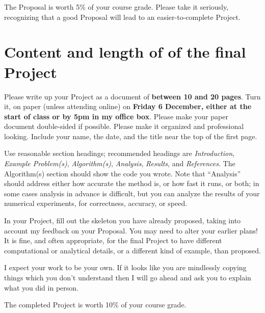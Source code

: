 \documentclass[11pt]{amsart}
\begin{document}
The Proposal is worth 5\% of your course grade.  Please take it seriously, recognizing that a good Proposal will lead to an easier-to-complete Project.


\section*{Content and length of of the final Project}  

Please write up your Project as a document of \textbf{between 10 and 20 pages}.  Turn it, on paper (unless attending online) on \textbf{Friday 6 December, either at the start of class or by 5pm in my office box}.  Please make your paper document double-sided if possible.  Please make it organized and professional looking.  Include your name, the date, and the title near the top of the first page.

Use reasonable section headings; recommended headings are \emph{Introduction}, \emph{Example Problem(s)}, \emph{Algorithm(s)}, \emph{Analysis}, \emph{Results}, and \emph{References}.  The Algorithm(s) section should show the code you wrote.  Note that ``Analysis'' should address either how accurate the method is, or how fast it runs, or both; in some cases analysis in advance is difficult, but you can analyze the results of your numerical experiments, for correctness, accuracy, or speed.

In your Project, fill out the skeleton you have already proposed, taking into account my feedback on your Proposal.  You may need to alter your earlier plans!  It is fine, and often appropriate, for the final Project to have different computational or analytical details, or a different kind of example, than proposed.

I expect your work to be your own.  If it looks like you are mindlessly copying things which you don't understand then I will go ahead and ask you to explain what you did in person.

The completed Project is worth 10\% of your course grade.
\end{document}
